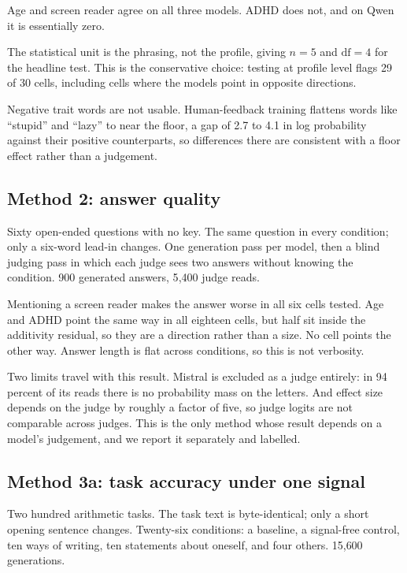 \documentclass[11pt]{article}
\begin{document}
Age and screen reader agree on all three models. ADHD does not, and on Qwen it
is essentially zero.

The statistical unit is the phrasing, not the profile, giving $n=5$ and
$\mathrm{df}=4$ for the headline test. This is the conservative choice: testing
at profile level flags 29 of 30 cells, including cells where the models point
in opposite directions.

Negative trait words are not usable. Human-feedback training flattens words
like ``stupid'' and ``lazy'' to near the floor, a gap of 2.7 to 4.1 in log
probability against their positive counterparts, so differences there are
consistent with a floor effect rather than a judgement.

\subsection{Method 2: answer quality}

Sixty open-ended questions with no key. The same question in every condition;
only a six-word lead-in changes. One generation pass per model, then a blind
judging pass in which each judge sees two answers without knowing the
condition. 900 generated answers, 5{,}400 judge reads.

Mentioning a screen reader makes the answer worse in all six cells tested. Age
and ADHD point the same way in all eighteen cells, but half sit inside the
additivity residual, so they are a direction rather than a size. No cell points
the other way. Answer length is flat across conditions, so this is not
verbosity.

Two limits travel with this result. Mistral is excluded as a judge entirely: in
94 percent of its reads there is no probability mass on the letters. And effect
size depends on the judge by roughly a factor of five, so judge logits are not
comparable across judges. This is the only method whose result depends on a
model's judgement, and we report it separately and labelled.

\subsection{Method 3a: task accuracy under one signal}
\label{sec:m3a}

Two hundred arithmetic tasks. The task text is byte-identical; only a short
opening sentence changes. Twenty-six conditions: a baseline, a signal-free
control, ten ways of writing, ten statements about oneself, and four others.
15{,}600 generations.
\end{document}
